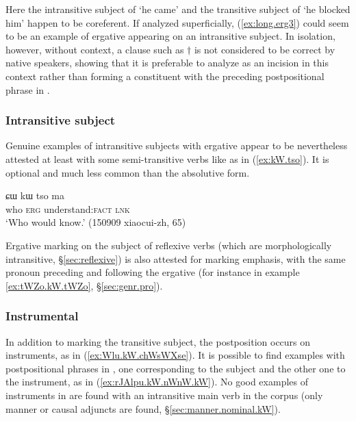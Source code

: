 Here the intransitive subject of   `he came' and the transitive subject of    `he blocked him' happen to be coreferent. If analyzed superficially, (\ref{ex:long.erg3}) could seem to be an example of ergative appearing on an intransitive subject. In isolation, however, without context, a clause such as $\dagger$ is not considered to be correct by native speakers, showing that it is preferable to analyze   as an incision in this context rather than forming a constituent with the preceding postpositional phrase in .

\subsubsection{Intransitive subject} \label{sec:S.kW}
Genuine examples of intransitive subjects with ergative appear to be nevertheless attested at least with some semi-transitive verbs like  as in (\ref{ex:kW.tso}). It is optional and much less common than the absolutive form.

\begin{exe}
\ex \label{ex:kW.tso}
\gll ɕɯ kɯ tso ma \\
who \textsc{erg} understand:\textsc{fact} \textsc{lnk} \\
\glt `Who would know.' (150909 xiaocui-zh, 65)
\end{exe}

Ergative marking on the subject of reflexive verbs (which are morphologically intransitive, §\ref{sec:reflexive}) is also attested for marking emphasis, with the same pronoun preceding and following the ergative (for instance  in example \ref{ex:tWZo.kW.tWZo}, §\ref{sec:genr.pro}).

\subsubsection{Instrumental} \label{sec:instr.kW}
In addition to marking the transitive subject, the postposition  occurs on instruments, as in (\ref{ex:Wlu.kW.chWsWXse}). It is possible to find examples with  postpositional phrases in , one corresponding to the subject and the other one to the instrument, as in (\ref{ex:rJAlpu.kW.nWnW.kW}). No good examples of instruments in  are found with an intransitive main verb in the corpus (only manner or causal adjuncts are found, §\ref{sec:manner.nominal.kW}).

